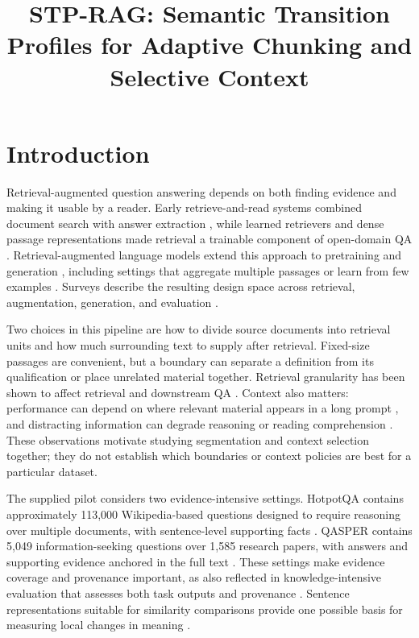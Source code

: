 \documentclass[10pt]{article}
\title{STP-RAG: Semantic Transition Profiles for Adaptive Chunking and Selective Context}
\author{}
\date{}
\begin{document}
\maketitle
\begin{abstract}
\end{abstract}
\section{Introduction}

Retrieval-augmented question answering depends on both finding evidence and making it usable by a reader. Early retrieve-and-read systems combined document search with answer extraction \cite{Chen2017ReadingWikipedia}, while learned retrievers and dense passage representations made retrieval a trainable component of open-domain QA \cite{Lee2019LatentRetrieval,Karpukhin2020DensePassage}. Retrieval-augmented language models extend this approach to pretraining and generation \cite{Guu2020RealmRetrievalaugmented,Lewis2020RetrievalaugmentedGeneration}, including settings that aggregate multiple passages or learn from few examples \cite{Izacard2020LeveragingPassage,Izacard2022FewshotLearning}. Surveys describe the resulting design space across retrieval, augmentation, generation, and evaluation \cite{Gao2023RetrievalaugmentedGeneration,Fan2024SurveyRag,Zhao2024RetrievalaugmentedGeneration,Yu2024EvaluationRetrievalaugmented}.

Two choices in this pipeline are how to divide source documents into retrieval units and how much surrounding text to supply after retrieval. Fixed-size passages are convenient, but a boundary can separate a definition from its qualification or place unrelated material together. Retrieval granularity has been shown to affect retrieval and downstream QA \cite{Chen2023DenseX}. Context also matters: performance can depend on where relevant material appears in a long prompt \cite{Liu2023LostMiddle}, and distracting information can degrade reasoning or reading comprehension \cite{Shi2023LargeLanguage,Jia2017AdversarialExamples}. These observations motivate studying segmentation and context selection together; they do not establish which boundaries or context policies are best for a particular dataset.

The supplied pilot considers two evidence-intensive settings. HotpotQA contains approximately 113,000 Wikipedia-based questions designed to require reasoning over multiple documents, with sentence-level supporting facts \cite{Yang2018HotpotqaDataset}. QASPER contains 5,049 information-seeking questions over 1,585 research papers, with answers and supporting evidence anchored in the full text \cite{Dasigi2021DatasetInformationseeking}. These settings make evidence coverage and provenance important, as also reflected in knowledge-intensive evaluation that assesses both task outputs and provenance \cite{Petroni2020KiltBenchmark}. Sentence representations suitable for similarity comparisons provide one possible basis for measuring local changes in meaning \cite{Reimers2019SentencebertSentence}.
\end{document}
